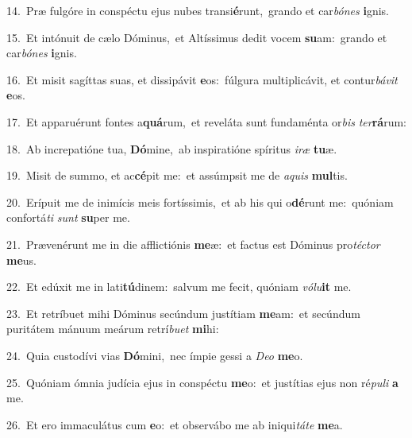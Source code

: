 {\numbfont\textcolor{\numbcolor}{14.}}~Præ fulgóre in conspéctu ejus nubes transi\-\textbf{é}\-runt,~\star grando et car\-\textit{bó}\-\textit{nes} \textbf{i}\-gnis.\par
{\numbfont\textcolor{\numbcolor}{15.}}~Et intónuit de cælo Dóminus,~\dagger et Altíssimus dedit vocem \textbf{su}\-am:~\star grando et car\-\textit{bó}\-\textit{nes} \textbf{i}\-gnis.\par
{\numbfont\textcolor{\numbcolor}{16.}}~Et misit sagíttas suas, et dissipávit \textbf{e}\-os:~\star fúlgura multiplicávit, et contur\-\textit{bá}\-\textit{vit} \textbf{e}\-os.\par
{\numbfont\textcolor{\numbcolor}{17.}}~Et apparuérunt fontes a\-\textbf{quá}\-rum,~\star et reveláta sunt fundaménta or\textit{bis} \textit{ter}\-\textbf{rá}rum:\par
{\numbfont\textcolor{\numbcolor}{18.}}~Ab increpatióne tua, \textbf{Dó}\-mine,~\star ab inspiratióne spíritus \textit{i}\-\textit{ræ} \textbf{tu}\-æ.\par
{\numbfont\textcolor{\numbcolor}{19.}}~Misit de summo, et ac\-\textbf{cé}\-pit me:~\star et assúmpsit me de \textit{a}\-\textit{quis} \textbf{mul}\-tis.\par
{\numbfont\textcolor{\numbcolor}{20.}}~Erípuit me de inimícis meis fortíssimis,~\dagger et ab his qui o\-\textbf{dé}\-runt me:~\star quóniam confortá\textit{ti} \textit{sunt} \textbf{su}\-per me.\par
{\numbfont\textcolor{\numbcolor}{21.}}~Prævenérunt me in die afflictiónis \textbf{me}\-æ:~\star et factus est Dóminus pro\-\textit{téc}\-\textit{tor} \textbf{me}\-us.\par
{\numbfont\textcolor{\numbcolor}{22.}}~Et edúxit me in lati\-\textbf{tú}\-dinem:~\star salvum me fecit, quóniam \textit{vó}\-\textit{lu}\textbf{it} me.\par
{\numbfont\textcolor{\numbcolor}{23.}}~Et retríbuet mihi Dóminus secúndum justítiam \textbf{me}\-am:~\star et secúndum puritátem mánuum meárum retrí\-\textit{bu}\-\textit{et} \textbf{mi}\-hi:\par
{\numbfont\textcolor{\numbcolor}{24.}}~Quia custodívi vias \textbf{Dó}\-mini,~\star nec ímpie gessi a \textit{De}\-\textit{o} \textbf{me}\-o.\par
{\numbfont\textcolor{\numbcolor}{25.}}~Quóniam ómnia judícia ejus in conspéctu \textbf{me}\-o:~\star et justítias ejus non ré\-\textit{pu}\-\textit{li} \textbf{a} me.\par
{\numbfont\textcolor{\numbcolor}{26.}}~Et ero immaculátus cum \textbf{e}\-o:~\star et observábo me ab iniqui\-\textit{tá}\-\textit{te} \textbf{me}\-a.\par
